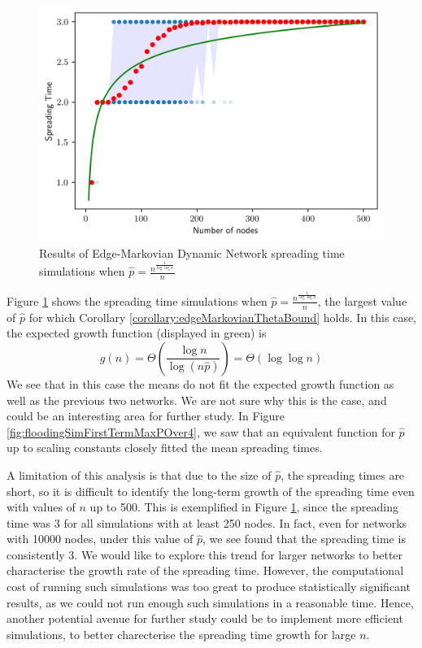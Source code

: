\begin{figure}[h]
	\centering
	\includegraphics[width=1\textwidth]{./figures/flooding_simulation_first_term_max_p_with_errors.png}
	\caption{Results of Edge-Markovian Dynamic Network spreading time simulations when $\hat{p} = \frac{n^\frac{1}{\log \log n}}{n}$}
	\label{fig:floodingSimFirstTermMaxP}
\end{figure}

Figure \ref{fig:floodingSimFirstTermMaxP} shows the spreading time simulations when $\hat{p} = \frac{n^\frac{1}{\log \log n}}{n}$, the largest value of $\hat{p}$ for which Corollary \ref{corollary:edgeMarkovianThetaBound} holds. In this case, the expected growth function (displayed in green) is
$$
	g(n)
	= \Theta\left(\frac{\log n}{\log (n\hat{p})}\right) 
	= \Theta\left(\log \log n \right)
$$
We see that in this case the means do not fit the expected growth function as well as the previous two networks. We are not sure why this is the case, and could be an interesting area for further study. In Figure \ref{fig:floodingSimFirstTermMaxPOver4}, we saw that an equivalent function for $\hat{p}$ up to scaling constants closely fitted the mean spreading times. %

A limitation of this analysis is that due to the size of $\hat{p}$, the spreading times are short, so it is difficult to identify the long-term growth of the spreading time even with values of $n$ up to 500. %
This is exemplified in Figure \ref{fig:floodingSimFirstTermMaxP}, since the spreading time was 3 for all simulations with at least 250 nodes. In fact, even for networks with 10000 nodes, under this value of $\hat{p}$, we see found that the spreading time is consistently 3. We would like to explore this trend for larger networks to better characterise the growth rate of the spreading time. However, the computational cost of running such simulations was too great to produce statistically significant results, as we could not run enough such simulations in a reasonable time. Hence, another potential avenue for further study could be to implement more efficient simulations, to better charecterise the spreading time growth for large $n$. 


